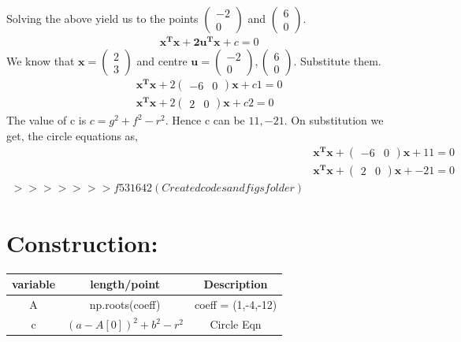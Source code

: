 \documentclass[a4paper,12pt,twocolumn]{article}
\let\vec\mathbf
\newcommand{\myvec}[1]{\ensuremath{\begin{pmatrix}#1\end{pmatrix}}}
\begin{document}
Solving the above yield us to the points $\myvec{-2\\0}$ and $\myvec{6\\0}$.
\begin{align}
	&\vec{x^Tx} + \vec{2u^Tx} + c = 0
\end{align}
We know that $\vec{x} = \myvec{2\\3}$ and centre $\vec{u} = \myvec{-2\\0},\myvec{6\\0}$. Substitute them.
\begin{align}
	&\vec{x^Tx} + 2\myvec{-6 &0}\vec{x} + c1 = 0\\
	&\vec{x^Tx} + 2\myvec{2 &0}\vec{x} + c2 = 0
\end{align}
The value of c is $c = g^2+f^2-r^2$. Hence c can be $11,-21$. On substitution we get, the circle equations as,
\begin{align}
	&\vec{x^Tx} + \myvec{-6 &0}\vec{x} + 11 = 0\\
	&\vec{x^Tx} + \myvec{2 &0}\vec{x} + -21 = 0\\
>>>>>>> f531642 (Created codes and figs folder)
\end{align}
\section{Construction:}

\begin{table}[h]
        \centering
\setlength\extrarowheight{2pt}
        \begin{tabular}{|c|c|c|}
                \hline
                \textbf{variable} & \textbf{length/point} & \textbf{Description}\\
                \hline
		A & np.roots(coeff) & coeff = (1,-4,-12)\\
		\hline
		c & $(a-A[0])^2+b^2-r^2$ & Circle Eqn\\
		\hline
        \end{tabular}
\end{table}
\end{document}
